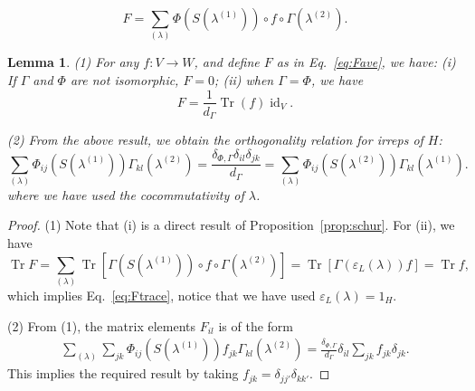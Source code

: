 \documentclass[10pt,a4paper]{amsart}
\newtheorem{lemma}{Lemma}
\newcommand\Tr{\operatorname{Tr}}
\newcommand{\cone}{(1)}
\newcommand{\ctwo}{(2)}
\newcommand{\id}{\operatorname{id}}
\begin{document}
\begin{equation}\label{eq:Fave}
    F=\sum_{(\lambda)} \Phi(S(\lambda^{(1)})) \circ f \circ \Gamma(\lambda^{\ctwo}).
\end{equation}

\begin{lemma}\label{prop:orthgonality}
 (1)  For any $f:V\to W$, and define $F$ as in Eq.~\eqref{eq:Fave}, we have: (i)  If $\Gamma$ and $\Phi$ are not isomorphic, $F=0$; (ii) when $\Gamma=\Phi$, we have
    \begin{equation}\label{eq:Ftrace}
        F=\frac{1}{d_{\Gamma}}\Tr (f) \id_V.
    \end{equation}
    
(2) From the above result, we obtain the orthogonality relation for irreps of $H$:
\begin{equation}
    \sum_{(\lambda)} \Phi_{ij}(S(\lambda^{\cone})) \Gamma_{kl}(\lambda^{\ctwo})=\frac{\delta_{\Phi,\Gamma} \delta_{il}\delta_{jk} }{d_{\Gamma}}=  \sum_{(\lambda)} \Phi_{ij}(S(\lambda^{\ctwo})) \Gamma_{kl}(\lambda^{\cone}).
\end{equation}
where we have used the cocommutativity of $\lambda$.
\end{lemma}

\begin{proof}
   (1) Note that (i) is a direct result of Proposition~\ref{prop:schur}.  For (ii), we have
   \begin{equation}
        \Tr F= \sum_{(\lambda)} \Tr [\Gamma(S(\lambda^{(1)})) \circ f \circ \Gamma(\lambda^{\ctwo})]=\Tr [\Gamma(\varepsilon_L(\lambda)) f]=\Tr f,
    \end{equation}
which implies Eq.~\eqref{eq:Ftrace}, notice that we have used $\varepsilon_L(\lambda)=1_H$.

(2) From (1), the matrix elements $F_{il}$ is of the form
\begin{equation}
    \begin{aligned}
         \sum_{(\lambda)} \sum_{jk} \Phi_{ij}(S(\lambda^{\cone}))f_{jk} \Gamma_{kl}(\lambda^{\ctwo})=  \frac{\delta_{\Phi,\Gamma}}{d_{\Gamma}} \delta_{il} \sum_{jk} f_{jk}\delta_{jk}.
    \end{aligned}
\end{equation}
This implies the required result by taking $f_{jk}=\delta_{jj'}\delta_{kk'}$.
\end{proof}
\end{document}
